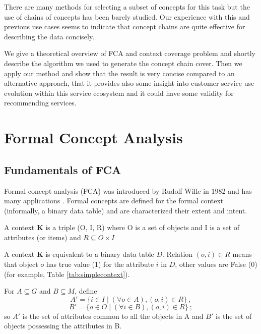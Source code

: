 \documentclass[acmconf,authordraft]{acmart}
\begin{document}
There are many methods for selecting a subset of concepts for this task but the use of chains of concepts has been barely studied. Our experience with this and previous use cases seems to indicate that concept chains are quite effective for describing the data concisely.

We give a theoretical overview of FCA and context coverage  problem and shortly describe the algorithm we used to generate the concept chain cover. Then we apply our method and show that the result is very concise compared to an alternative approach,  that it provides also some insight into customer service use evolution within this service ecosystem and it could have some validity for recommending services.

\section{Formal Concept Analysis}

\subsection{Fundamentals of FCA}

 Formal concept analysis (FCA) was introduced by Rudolf Wille in 1982 \cite{wille_restructuring_2009} and has many applications \cite{ganter_formal_2005}. Formal concepts are defined for the formal context (informally, a binary data table) and are characterized their extent and intent.


\begin{definition} 
A context \textbf{K} is a triple (O, I, R) where O is a set of objects and I is a set of attributes (or items) and $ {R \subseteq O \times I} $
\end{definition}

A context \textbf{K} is equivalent to a binary data table $D$. Relation $(o, i) \in R$ means that object $o$ has true value (1) for the attribute $i$ in $D$, other values are False (0) (for example, Table \ref{tab:simplecontext}). 

\begin{definition} 
For $ A \subseteq G $ and $ B \subseteq M $, define 
\begin{equation}
A'=\bigl\{i \in I \mid (\forall o \in A), (o, i) \in R \bigr\} \ ,
\end{equation}
\begin{equation}
B'=\bigl\{o \in O \mid (\forall i \in B), (o, i) \in R \bigr\} \ ;
\end{equation}
so $A'$ is the set of attributes common to all the objects in A and $B'$ is the set of objects possessing the attributes in B.
\label{def:prim}
\end{definition}
\end{document}
